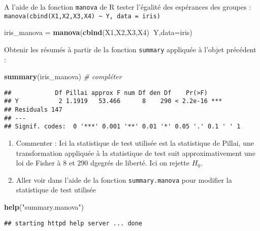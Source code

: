 \documentclass[
]{article}
\newenvironment{Shaded}{\begin{snugshade}}{\end{snugshade}}
\newcommand{\CommentTok}[1]{\textcolor[rgb]{0.56,0.35,0.01}{\textit{#1}}}
\newcommand{\DataTypeTok}[1]{\textcolor[rgb]{0.13,0.29,0.53}{#1}}
\newcommand{\KeywordTok}[1]{\textcolor[rgb]{0.13,0.29,0.53}{\textbf{#1}}}
\newcommand{\NormalTok}[1]{#1}
\newcommand{\OperatorTok}[1]{\textcolor[rgb]{0.81,0.36,0.00}{\textbf{#1}}}
\newcommand{\StringTok}[1]{\textcolor[rgb]{0.31,0.60,0.02}{#1}}
\begin{document}
A l'aide de la fonction \texttt{manova} de R tester l'égalité des
espérances des groupes :
\texttt{manova(cbind(X1,X2,X3,X4)\ \textasciitilde{}\ Y,\ data\ =\ iris)}

\begin{Shaded}
\begin{Highlighting}[]
\NormalTok{iris_manova =}\StringTok{ }\KeywordTok{manova}\NormalTok{(}\KeywordTok{cbind}\NormalTok{(X1,X2,X3,X4)}\OperatorTok{~}\NormalTok{Y,}\DataTypeTok{data=}\NormalTok{iris)}
\end{Highlighting}
\end{Shaded}

Obtenir les résumés à partir de la fonction \texttt{summary} appliquée à
l'objet précédent :

\begin{Shaded}
\begin{Highlighting}[]
\KeywordTok{summary}\NormalTok{(iris_manova) }\CommentTok{# compléter}
\end{Highlighting}
\end{Shaded}

\begin{verbatim}
##            Df Pillai approx F num Df den Df    Pr(>F)    
## Y           2 1.1919   53.466      8    290 < 2.2e-16 ***
## Residuals 147                                            
## ---
## Signif. codes:  0 '***' 0.001 '**' 0.01 '*' 0.05 '.' 0.1 ' ' 1
\end{verbatim}

\begin{enumerate}
\def\labelenumi{\arabic{enumi}.}
\setcounter{enumi}{11}
\item
  Commenter : Ici la statistique de test utilisée est la statistique de
  Pillai, une transformation appliquée à la statistique de test suit
  approximativement une loi de Fisher à \(8\) et \(290\) dgegrés de
  liberté. Ici on rejette \(H_0\).
\item
  Aller voir dans l'aide de la fonction \texttt{summary.manova} pour
  modifier la statistique de test utilisée
\end{enumerate}

\begin{Shaded}
\begin{Highlighting}[]
\KeywordTok{help}\NormalTok{(}\StringTok{"summary.manova"}\NormalTok{)}
\end{Highlighting}
\end{Shaded}

\begin{verbatim}
## starting httpd help server ... done
\end{verbatim}
\end{document}
